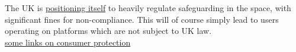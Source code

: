 The UK is \href{https://bills.parliament.uk/bills/3137}{positioning itself} to heavily regulate safeguarding in the space, with significant fines for non-compliance. This will of course simply lead to users operating on platforms which are not subject to UK law. \\

\href{https://dataethics.eu/the-three-ms-of-the-metaverse/}{some links on consumer protection}
%

